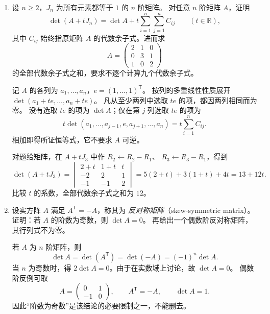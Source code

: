 \documentclass[UTF8,12pt,a4paper,fontset=fandol]{ctexart}
\begin{document}
\begin{enumerate}[label=\arabic*.,resume=detquestions]
\begin{solve}
当 $\lambda\notin\{1,-2\}$ 时，$D\ne0$，所以有唯一解。
令 $s=x+y+z$，三式可写为
\[
(\lambda-1)x+s=1,\quad
(\lambda-1)y+s=1,\quad
(\lambda-1)z+s=-2.
\]
三式相加得 $(\lambda+2)s=0$，故 $s=0$，从而
\[
\boxed{(x,y,z)=\left(\frac1{\lambda-1},\frac1{\lambda-1},
-\frac2{\lambda-1}\right).}
\]

当 $\lambda=1$ 时，前两式要求 $x+y+z=1$，第三式要求 $x+y+z=-2$，故无解。

当 $\lambda=-2$ 时，三式分别给出
$x=(s-1)/3$、$y=(s-1)/3$、$z=(s+2)/3$，它们的和恒为 $s$。
因此 $s$ 可以任取实数，全部解为
\[
\boxed{(x,y,z)=(-1/3,-1/3,2/3)+t(1,1,1),\qquad t\in\mathbb R.}
\]
两个使系数行列式为零的参数对应不同情况，不能仅凭 $D=0$ 判定无解。
\end{solve}

\item\label{q:all-cofactors}
设 $n\geq2$，$J_n$ 为所有元素都等于 $1$ 的 $n$ 阶矩阵。
对任意 $n$ 阶矩阵 $A$，证明
\[
\det(A+tJ_n)=\det A+t\sum_{i=1}^n\sum_{j=1}^n C_{ij}
\qquad(t\in\mathbb R),
\]
其中 $C_{ij}$ 始终指原矩阵 $A$ 的代数余子式。进而求
\[
A=\begin{pmatrix}2&1&0\\0&3&1\\1&0&2\end{pmatrix}
\]
的全部代数余子式之和，要求不逐个计算九个代数余子式。
\begin{solve}
记 $A$ 的各列为 $a_1,\ldots,a_n$，$e=(1,\ldots,1)^{\mathsf T}$。
按列的多重线性性质展开 $\det(a_1+te,\ldots,a_n+te)$。
凡从至少两列中选取 $te$ 的项，都因两列相同而为零。
没有选取 $te$ 的项为 $\det A$；仅在第 $j$ 列选取 $te$ 的项为
\[
t\det(a_1,\ldots,a_{j-1},e,a_{j+1},\ldots,a_n)
=t\sum_{i=1}^n C_{ij}.
\]
相加即得所证恒等式，它不要求 $A$ 可逆。

对题给矩阵，在 $A+tJ_3$ 中作 $R_2\leftarrow R_2-R_1$、
$R_3\leftarrow R_3-R_1$，得到
\[
\det(A+tJ_3)=
\begin{vmatrix}2+t&1+t&t\\-2&2&1\\-1&-1&2\end{vmatrix}
=5(2+t)+3(1+t)+4t=13+12t.
\]
比较 $t$ 的系数，全部代数余子式之和为 $\boxed{12}$。
\end{solve}

\item\label{q:skew-symmetric}
设实方阵 $A$ 满足 $A^{\mathsf T}=-A$，称其为
\emph{反对称矩阵}（skew-symmetric matrix）。
证明：若 $A$ 的阶数为奇数，则 $\det A=0$。
再给出一个偶数阶反对称矩阵，其行列式不为零。
\begin{solve}
若 $A$ 为 $n$ 阶矩阵，则
\[
\det A=\det(A^{\mathsf T})=\det(-A)=(-1)^n\det A.
\]
当 $n$ 为奇数时，得 $2\det A=0$。由于在实数域上讨论，故 $\det A=0$。
偶数阶反例可取
\[
A=\begin{pmatrix}0&1\\-1&0\end{pmatrix},
\qquad A^{\mathsf T}=-A,\qquad\det A=1.
\]
因此“阶数为奇数”是该结论的必要限制之一，不能删去。
\end{solve}


\end{enumerate}
\end{document}

